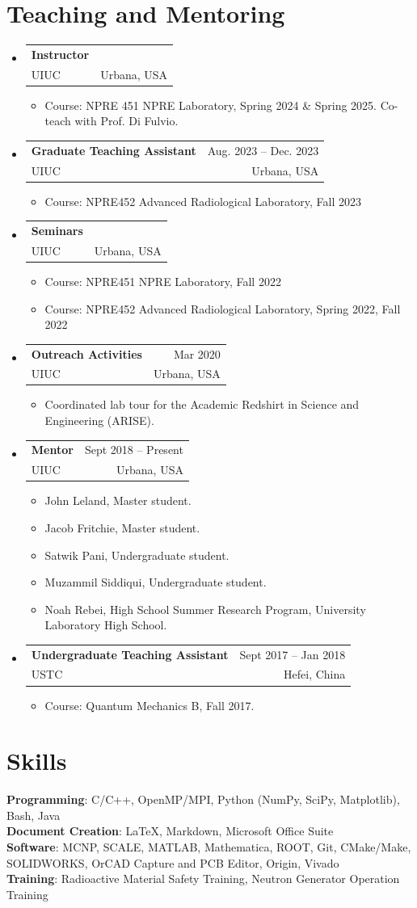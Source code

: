 \documentclass[letterpaper,11pt]{article} %
\makeatletter
\newcommand{\CVItem}[1]{
  \item\small{
    {#1 \vspace{-2pt}}
  }
}
\newcommand{\CVSubheading}[4]{
  \vspace{-2pt}\item
    \begin{tabular*}{0.97\textwidth}[t]{l@{\extracolsep{\fill}}r}
      \textbf{#1} & \footnotesize #2 \\
      \footnotesize #3 & \footnotesize #4 \\
    \end{tabular*}\vspace{-7pt}
}
\newcommand{\CVSubHeadingListStart}{\begin{itemize}[leftmargin=0.5cm, label={}]}
\newcommand{\CVSubHeadingListEnd}{\end{itemize}}
\newcommand{\CVItemListStart}{\begin{itemize}[rightmargin=\dimexpr\linewidth-15cm-\leftmargin\relax]}
\newcommand{\CVItemListEnd}{\end{itemize}\vspace{-5pt}}
\makeatother
\begin{document}
\section{Teaching and Mentoring}
\CVSubHeadingListStart
    \CVSubheading
    {Instructor}{ }
    {UIUC}{Urbana, USA}
    \CVItemListStart
      \CVItem{Course: NPRE 451 NPRE Laboratory, Spring 2024 \& Spring 2025. Co-teach with Prof. Di Fulvio.}
    \CVItemListEnd
    \CVSubheading
      {Graduate Teaching Assistant}{Aug. 2023 – Dec. 2023}
      {UIUC}{Urbana, USA}
      \CVItemListStart
        \CVItem{Course: NPRE452 Advanced Radiological Laboratory, Fall 2023}
      \CVItemListEnd
    \CVSubheading
      {Seminars}{}
      {UIUC}{Urbana, USA}
      \CVItemListStart
        \CVItem{Course: NPRE451 NPRE Laboratory, Fall 2022}
        \CVItem{Course: NPRE452 Advanced Radiological Laboratory, Spring 2022, Fall 2022}
      \CVItemListEnd
    \CVSubheading
      {Outreach Activities}{Mar 2020}
      {UIUC}{Urbana, USA}
      \CVItemListStart
        \CVItem{Coordinated lab tour for the Academic Redshirt in Science and Engineering (ARISE).}
      \CVItemListEnd
    \CVSubheading
      {Mentor}{Sept 2018 – Present}
      {UIUC}{Urbana, USA}
      \CVItemListStart
        \CVItem{John Leland, Master student.}
        \CVItem{Jacob Fritchie, Master student.}
        \CVItem{Satwik Pani, Undergraduate student.}
        \CVItem{Muzammil Siddiqui, Undergraduate student.}
        \CVItem{Noah Rebei, High School Summer Research Program, University Laboratory High School.}
      \CVItemListEnd
    \CVSubheading
      {Undergraduate Teaching Assistant}{Sept 2017 – Jan 2018}
      {USTC}{Hefei, China}
      \CVItemListStart
        \CVItem{Course: Quantum Mechanics B, Fall 2017.}
      \CVItemListEnd
  \CVSubHeadingListEnd

\section{Skills}
 \begin{itemize}[leftmargin=0.5cm, label={}]
    {\item{
     \textbf{Programming}{: C/C++, OpenMP/MPI, Python (NumPy, SciPy, Matplotlib), Bash, Java} \\
     \textbf{Document Creation}{: \LaTeX, Markdown, Microsoft Office Suite} \\
     \textbf{Software}{: MCNP, SCALE, MATLAB, Mathematica, ROOT, Git, CMake/Make, SOLIDWORKS, OrCAD Capture and PCB Editor, Origin, Vivado}\\
     \textbf{Training}{: Radioactive Material Safety Training, Neutron Generator Operation Training}
    }}
 \end{itemize}
\end{document}
